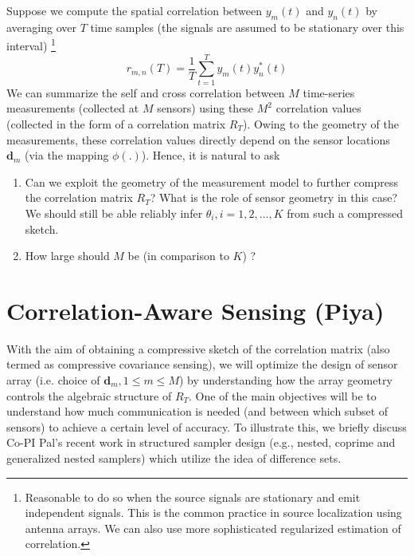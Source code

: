 \documentclass{article}
\begin{document}
 Suppose we compute the spatial correlation between $y_m(t)$ and $y_n(t)$  by averaging over $T$ time samples (the signals are assumed to be stationary over this interval) \footnote{Reasonable to do so when the source signals are stationary and emit independent signals. This is the common practice in source localization using antenna arrays. We can also use more sophisticated regularized estimation of correlation.}
\begin{equation}
r_{m,n} (T) = \frac{1}{T}\sum_{t=1}^{T} y_m (t) y^*_n (t) 
\end{equation} 
We can summarize the self and cross correlation between $M$ time-series measurements (collected at $M$ sensors) using these $M^2$ correlation values (collected in the form of a correlation matrix $R_T$). Owing to the geometry of the measurements, these correlation values directly depend on the sensor locations $\mathbf{d}_m$  (via the mapping $\phi(.)$). Hence, it is natural to ask 
\begin{enumerate}
\item Can we exploit the geometry of the measurement model to further compress the  correlation matrix $R_T$? What is the role of sensor geometry in this case? We should still be able reliably infer $\theta_i, i=1,2,\ldots, K$ from such a compressed sketch.
\item How large should $M$ be (in comparison to $K$) ?
\end{enumerate}

\section{Correlation-Aware Sensing (Piya)} 
With the aim of obtaining a compressive sketch of the correlation matrix (also termed as compressive covariance sensing), we will optimize the design of sensor array (i.e. choice of $\mathbf{d}_m, 1\leq m\leq M$) by understanding how the array geometry controls the algebraic structure of $R_T$. One of the main objectives will be to understand how much communication is needed (and between which subset of sensors) to achieve a certain level of accuracy. To illustrate this, we briefly discuss Co-PI Pal's recent work in structured sampler design (e.g., nested, coprime and generalized nested samplers) which utilize the idea of difference sets.
\end{document}
